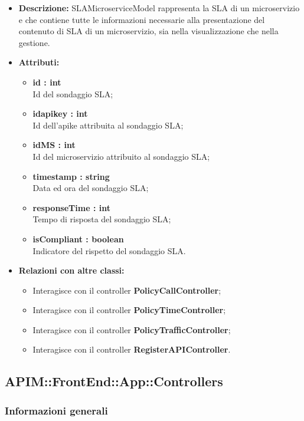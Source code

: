 \begin{itemize}
	\item \textbf{Descrizione:} SLAMicroserviceModel rappresenta la SLA di un microservizio e che
contiene tutte le informazioni necessarie alla presentazione del contenuto di SLA di un microservizio, sia nella visualizzazione che nella gestione.
	\item \textbf{Attributi:}
		\begin{itemize}
			\item \textbf{id : int}\\
			Id del sondaggio SLA;
			\item \textbf{idapikey : int}\\
			Id dell'apike attribuita al sondaggio SLA;
			\item \textbf{idMS : int}\\
			Id del microservizio attribuito al sondaggio SLA;
			\item \textbf{timestamp : string}\\
			Data ed ora del sondaggio SLA;
			\item \textbf{responseTime : int}\\
			Tempo di risposta del sondaggio SLA;
			\item \textbf{isCompliant : boolean}\\
			Indicatore del rispetto del sondaggio SLA.
		\end{itemize}
	\item \textbf{Relazioni con altre classi:}
		\begin{itemize}
			\item Interagisce con il controller \textbf{PolicyCallController};
			\item Interagisce con il controller \textbf{PolicyTimeController};
			\item Interagisce con il controller \textbf{PolicyTrafficController};
			\item Interagisce con il controller \textbf{RegisterAPIController}.		
		\end{itemize}
\end{itemize}


\subsection{APIM::FrontEnd::App::Controllers}

\subsubsection{Informazioni generali}

